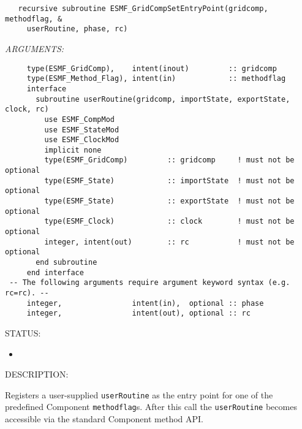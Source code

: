   
\begin{verbatim}   recursive subroutine ESMF_GridCompSetEntryPoint(gridcomp, methodflag, &
     userRoutine, phase, rc)
 \end{verbatim}{\em ARGUMENTS:}
\begin{verbatim}     type(ESMF_GridComp),    intent(inout)         :: gridcomp
     type(ESMF_Method_Flag), intent(in)            :: methodflag
     interface
       subroutine userRoutine(gridcomp, importState, exportState, clock, rc)
         use ESMF_CompMod
         use ESMF_StateMod
         use ESMF_ClockMod
         implicit none
         type(ESMF_GridComp)         :: gridcomp     ! must not be optional
         type(ESMF_State)            :: importState  ! must not be optional
         type(ESMF_State)            :: exportState  ! must not be optional
         type(ESMF_Clock)            :: clock        ! must not be optional
         integer, intent(out)        :: rc           ! must not be optional
       end subroutine
     end interface
 -- The following arguments require argument keyword syntax (e.g. rc=rc). --
     integer,                intent(in),  optional :: phase
     integer,                intent(out), optional :: rc\end{verbatim}
{\sf STATUS:}
   \begin{itemize}
   \item{}
   \end{itemize}
  
{\sf DESCRIPTION:\\ }


   Registers a user-supplied {\tt userRoutine} as the entry point for one of the
   predefined Component {\tt methodflag}s. After this call the {\tt userRoutine}
   becomes accessible via the standard Component method API.
  
